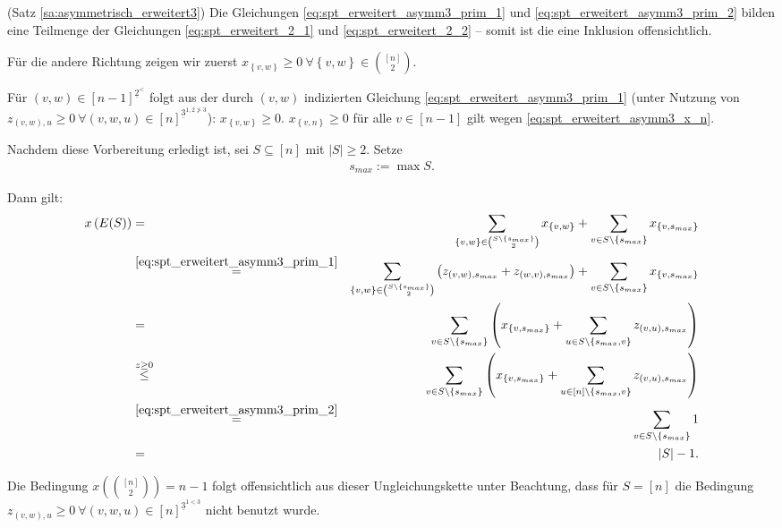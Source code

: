 \documentclass[10p,a4paper,BCOR = 12mm, DIV=15]{scrbook}
\begin{document}
\begin{bew} (Satz \ref{sa:asymmetrisch_erweitert3})
Die Gleichungen \eqref{eq:spt_erweitert_asymm3_prim_1} und \eqref{eq:spt_erweitert_asymm3_prim_2} bilden eine Teilmenge der Gleichungen \eqref{eq:spt_erweitert_2_1} und \eqref{eq:spt_erweitert_2_2} -- somit ist die eine Inklusion offensichtlich.

Für die andere Richtung zeigen wir zuerst $x_{\left\{v, w\right\}}\geq 0 \ \forall \left\{v, w\right\} \in {\left[n\right] \choose 2}$. 

Für $\left(v, w\right)\in [n-1]^{\underline{2}^<}$ folgt aus der durch $\left(v, w\right)$ indizierten Gleichung \eqref{eq:spt_erweitert_asymm3_prim_1} (unter Nutzung von $z_{\left(v, w\right), u} \geq 0 \ \forall \left(v, w, u\right) \in \left[n\right]^{\underline{3}^{1,2\not>3}}$): $x_{\left\{v, w\right\}} \geq 0$. $x_{\left\{v, n\right\}} \geq 0$ für alle $v \in \left[n-1\right]$ gilt wegen \eqref{eq:spt_erweitert_asymm3_x_n}.

Nachdem diese Vorbereitung erledigt ist, sei $S\subseteq \left[n\right]$ mit $\left|S\right| \geq 2$. Setze
\begin{eqnarray*}
s_{max} := \max S.
\end{eqnarray*}

Dann gilt:
{
\allowdisplaybreaks
\begin{eqnarray*}
x\left(E(S)\right) & = & \sum_{\left\{v, w\right\} \in {S \backslash \left\{s_{max}\right\} \choose 2}} x_{\left\{v, w\right\}} + \sum_{v \in S \backslash \left\{s_{max}\right\}} x_{\left\{v, s_{max}\right\}} \\
& \stackrel{\eqref{eq:spt_erweitert_asymm3_prim_1}}{=} & \sum_{\left\{v, w\right\} \in {S \backslash \left\{s_{max}\right\} \choose 2}} \left(z_{\left(v, w\right), s_{max}} + z_{\left(w, v\right), s_{max}}\right) + \sum_{v \in S \backslash \left\{s_{max}\right\}} x_{\left\{v, s_{max}\right\}} \\
& = & \sum_{v \in S \backslash \left\{s_{max}\right\}} \left(x_{\left\{v, s_{max}\right\}} + \sum_{u \in S \backslash \left\{s_{max}, v\right\}} z_{\left(v, u\right), s_{max}}\right) \\
& \stackrel{z \geq 0}{\leq} & \sum_{v \in S \backslash \left\{s_{max}\right\}} \left(x_{\left\{v, s_{max}\right\}} + \sum_{u \in \left[n\right] \backslash \left\{s_{max}, v\right\}} z_{\left(v, u\right), s_{max}}\right) \\
& \stackrel{\eqref{eq:spt_erweitert_asymm3_prim_2}}{=} & \sum_{v \in S \backslash \left\{s_{max}\right\}} 1 \\
& = & \left|S\right| - 1.
\end{eqnarray*}
}

Die Bedingung $x\left({\left[n\right] \choose 2}\right) = n-1$ folgt offensichtlich aus dieser Ungleichungskette unter Beachtung, dass für $S=\left[n\right]$ die Bedingung $z_{\left(v, w\right), u} \geq 0 \ \forall \left(v, w, u\right) \in \left[n\right]^{\underline{3}^{1<3}}$ nicht benutzt wurde.
\end{bew}
\end{document}
